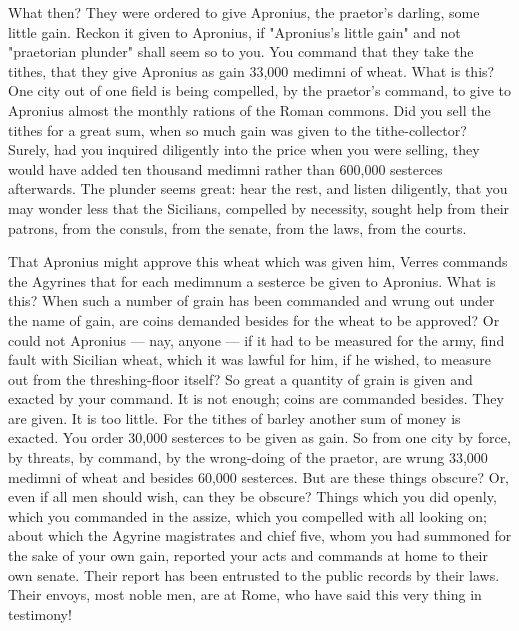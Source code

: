  What then? They were ordered to give Apronius, the praetor's darling, some little gain. Reckon it given to Apronius, if "Apronius's little gain" and not "praetorian plunder" shall seem so to you. You command that they take the tithes, that they give Apronius as gain 33,000 medimni of wheat. What is this? One city out of one field is being compelled, by the praetor's command, to give to Apronius almost the monthly rations of the Roman commons. Did you sell the tithes for a great sum, when so much gain was given to the tithe-collector? Surely, had you inquired diligently into the price when you were selling, they would have added ten thousand medimni rather than 600,000 sesterces afterwards. The plunder seems great: hear the rest, and listen diligently, that you may wonder less that the Sicilians, compelled by necessity, sought help from their patrons, from the consuls, from the senate, from the laws, from the courts.

 That Apronius might approve this wheat which was given him, Verres commands the Agyrines that for each medimnum a sesterce be given to Apronius. What is this? When such a number of grain has been commanded and wrung out under the name of gain, are coins demanded besides for the wheat to be approved? Or could not Apronius --- nay, anyone --- if it had to be measured for the army, find fault with Sicilian wheat, which it was lawful for him, if he wished, to measure out from the threshing-floor itself? So great a quantity of grain is given and exacted by your command. It is not enough; coins are commanded besides. They are given. It is too little. For the tithes of barley another sum of money is exacted. You order 30,000 sesterces to be given as gain. So from one city by force, by threats, by command, by the wrong-doing of the praetor, are wrung 33,000 medimni of wheat and besides 60,000 sesterces. But are these things obscure? Or, even if all men should wish, can they be obscure? Things which you did openly, which you commanded in the assize, which you compelled with all looking on; about which the Agyrine magistrates and chief five, whom you had summoned for the sake of your own gain, reported your acts and commands at home to their own senate. Their report has been entrusted to the public records by their laws. Their envoys, most noble men, are at Rome, who have said this very thing in testimony!

